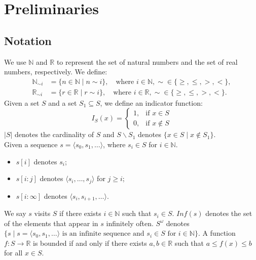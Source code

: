 \documentclass[acmlarge]{acmart}
\begin{document}
\section{Preliminaries}
\subsection{Notation}
\label{notation123}
We use \(\mathbb{N}\) and \(\mathbb{R}\) to represent the set of natural numbers and the set of real numbers, respectively. We define:
\begin{align*}
  \mathbb{N}_{\sim i} &= \{n \in \mathbb{N} \mid n \sim i\}, \quad \text{where } i \in \mathbb{N}, \sim \in \{\geq, \leq, >, <\}, \\
  \mathbb{R}_{\sim i} &= \{r \in \mathbb{R} \mid r \sim i\}, \quad \text{where } i \in \mathbb{R}, \sim \in \{\geq, \leq, >, <\}.
\end{align*}
Given a set \( S \) and a set $S_1 \subseteq S$, we define an indicator function:
$$I_S(x) = 
  \begin{cases} 
  1, & \text{if } x \in S \\
  0, & \text{if } x \not\in S 
  \end{cases}$$ 
$|S|$ denotes the cardinality of $S$ and $S\backslash S_1$ denotes $\{x \in S \mid x \not\in S_1\}$.\\
Given a sequence \( s = \langle s_0, s_1, \dots \rangle \), where $s_i \in S$ for $i \in \mathbb{N}$.
\begin{itemize}
  \item \( s[i] \) denotes \( s_i \);
  \item \( s[i:j] \) denotes \( \langle s_i, \dots, s_j \rangle \) for \( j \geq i \);
  \item \( s[i:\infty] \) denotes \( \langle s_i, s_{i+1}, \dots \rangle \).
\end{itemize}
We say $s$ visits $S$ if there exists $i \in \mathbb{N}$ such that $s_i \in S$. $Inf(s)$ denotes the set of the elements that appear in $s$ infinitely often. $S^{\omega}$ denotes $\{s \mid s=\langle s_0, s_1, \dots \rangle\text{ is an infinite sequence and }s_i \in S\text{ for }i \in \mathbb{N}\}$. A function $f: S \rightarrow \mathbb{R}$ is bounded if and only if there exists $a, b \in \mathbb{R}$ such that $a \leq f(x) \leq b$ for all $x \in S$.
\end{document}
